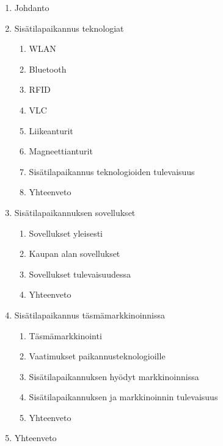 \documentclass[12pt,a4paper,finnish,oneside]{article}
\begin{document}
\renewcommand{\labelenumii}{\theenumii}
\renewcommand{\theenumii}{\theenumi.\arabic{enumii}.}
\begin{enumerate}
	\item Johdanto
	\item Sisätilapaikannus teknologiat
		\begin{enumerate}
    			\item WLAN
    			\item Bluetooth
    			\item RFID
			\item VLC
			\item Liikeanturit
			\item Magneettianturit
			\item Sisätilapaikannus teknologioiden tulevaisuus
			\item Yhteenveto
 		 \end{enumerate}
	\item Sisätilapaikannuksen sovellukset
		\begin{enumerate}
    			\item Sovellukset yleisesti
			\item Kaupan alan sovellukset
			\item Sovellukset tulevaisuudessa
			\item Yhteenveto
 		 \end{enumerate}
	\item Sisätilapaikannus täsmämarkkinoinnissa
		\begin{enumerate}
    			\item Täsmämarkkinointi
			\item Vaatimukset paikannusteknologioille 
			\item Sisätilapaikannuksen hyödyt markkinoinnissa
			\item Sisätilapaikannuksen ja markkinoinnin tulevaisuus
			\item Yhteenveto
 		 \end{enumerate}
  	\item Yhteenveto
\end{enumerate}

%


%


% 

\renewcommand{\refname}{Lähteet}  %

%

\end{document}
